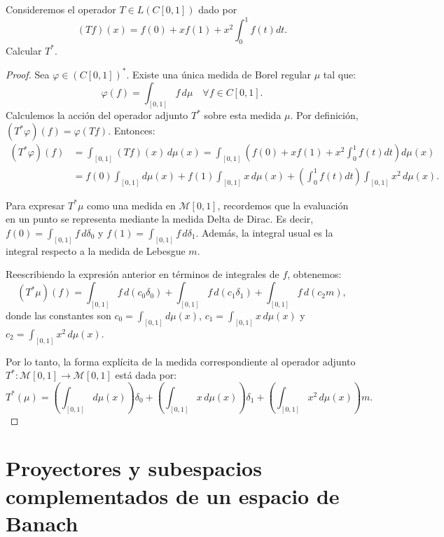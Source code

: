 \documentclass{article}
\theoremstyle{definition}
\newenvironment{ejercicio}[1]{\begin{trivlist}
\item[\hskip \labelsep {\bfseries Ejercicio}\hskip \labelsep {\bfseries #1.}]}{\end{trivlist}}
\begin{document}
\vspace{0.5cm}

\begin{ejercicio}{8}
	Consideremos el operador \( T\in L(C[0,1]) \) dado por
	\[ (Tf)(x) = f(0) + xf(1) + x^{2}\int_{0}^{1}f(t)dt. \]
	Calcular \( T^{*} \).
\end{ejercicio}
\begin{proof}
	Sea \(\varphi \in {(C[0, 1])}^*\). Existe una única medida de Borel regular \( \mu \) tal que:
	\[
		\varphi(f) = \int_{[0, 1]} f \, d\mu \quad \forall f \in C[0, 1].
	\]
	Calculemos la acción del operador adjunto \(T^*\) sobre esta medida \( \mu \). Por definición, \((T^*\varphi)(f) = \varphi(Tf)\). Entonces:
	\begin{align*}
		(T^*\varphi)(f) & = \int_{[0, 1]} (Tf)(x) \, d\mu(x) = \int_{[0, 1]} \left( f(0) + xf(1) + x^{2}\int_{0}^{1}f(t)dt \right) d\mu(x)                     \\
		                & = f(0) \int_{[0, 1]} d\mu(x) + f(1) \int_{[0, 1]} x \, d\mu(x) + \left( \int_{0}^{1} f(t) dt \right) \int_{[0, 1]} x^{2} \, d\mu(x).
	\end{align*}

	Para expresar \( T^*\mu \) como una medida en \(\mathcal{M}[0,1]\), recordemos que la evaluación en un punto se representa mediante la medida Delta de Dirac. Es decir, \(f(0) = \int_{[0,1]} f \, d\delta_0\) y \(f(1) = \int_{[0,1]} f \, d\delta_1\). Además, la integral usual es la integral respecto a la medida de Lebesgue \(m\).

	Reescribiendo la expresión anterior en términos de integrales de \(f\), obtenemos:
	\[
		(T^*\mu)(f) = \int_{[0,1]} f \, d\left( c_0 \delta_0 \right) + \int_{[0,1]} f \, d\left( c_1 \delta_1 \right) + \int_{[0,1]} f \, d\left( c_2 m \right),
	\]
	donde las constantes son \(c_0 = \int_{[0, 1]} d\mu(x)\), \(c_1 = \int_{[0, 1]} x \, d\mu(x)\) y \(c_2 = \int_{[0, 1]} x^{2} \, d\mu(x)\).

	Por lo tanto, la forma explícita de la medida correspondiente al operador adjunto \(T^*: \mathcal{M}[0,1] \rightarrow \mathcal{M}[0,1]\) está dada por:
	\[
		T^*(\mu) = \left( \int_{[0, 1]} d\mu(x) \right) \delta_0 + \left( \int_{[0, 1]} x \, d\mu(x) \right) \delta_1 + \left( \int_{[0, 1]} x^{2} \, d\mu(x) \right) m.
	\]
\end{proof}

\vspace{0.5cm}

\section{Proyectores y subespacios complementados de un espacio de Banach}
\end{document}
